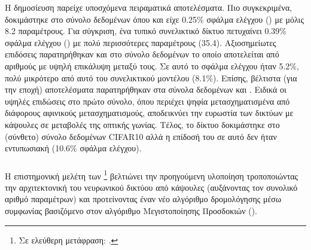 Η δημοσίευση  παρείχε υποσχόμενα πειραματικά αποτελέσματα. Πιο συγκεκριμένα, δοκιμάστηκε στο σύνολο δεδομένων \cite{lecun1998gradientMNIST} όπου και είχε 0.25\% σφάλμα ελέγχου () με μόλις 8.2 παραμέτρους. Για σύγκριση, ένα τυπικό  συνελικτικό δίκτυο πετυχαίνει 0.39\% σφάλμα ελέγχου () με πολύ περισσότερες παραμέτρους (35.4). Αξιοσημείωτες επιδόσεις παρατηρήθηκαν και στο \cite{sabour2017dynamic} σύνολο δεδομένων το οποίο αποτελείται από αριθμούς με υψηλή επικάλυψη μεταξύ τους. Σε αυτό το σφάλμα ελέγχου ήταν 5.2\%, πολύ μικρότερο από αυτό του συνελικτικού μοντέλου (8.1\%). Επίσης, βέλτιστα (για την εποχή) αποτελέσματα παρατηρήθηκαν στα σύνολα δεδομένων  και . Ειδικά οι υψηλές επιδώσεις στο πρώτο σύνολο, όπου περιέχει ψηφία μετασχηματισμένα από διάφορους αφινικούς μετασχηματισμούς, αποδεικνύει την ευρωστία των δικτύων με κάψουλες σε μεταβολές της οπτικής γωνίας. Τέλος, το δίκτυο δοκιμάστηκε στο (σύνθετο) σύνολο δεδομένων CIFAR10 αλλά η επίδοσή του σε αυτό δεν ήταν εντυπωσιακή (10.6\% σφάλμα ελέγχου).

\subsubsection{}

Η επιστημονική μελέτη των \footnote{Σε ελεύθερη μετάφραση: .}\cite{hinton2018matrix} βελτιώνει την προηγούμενη υλοποίηση τροποποιώντας την αρχιτεκτονική του νευρωνικού δικτύου από κάψουλες (αυξάνοντας τον συνολικό αριθμό παραμέτρων) και προτείνοντας έναν νέο αλγόριθμο δρομολόγησης μέσω συμφωνίας βασιζόμενο στον αλγόριθμο Μεγιστοποίησης Προσδοκιών (). \par

